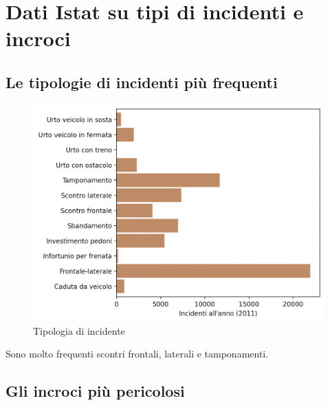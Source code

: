\documentclass[a4paper]{report}
\begin{document}

\section{Dati Istat su tipi di incidenti e incroci}

\subsection{Le tipologie di incidenti più frequenti}

\begin{figure}
    \includegraphics[width=\linewidth]{../src/incidenti/incidenti_senza_coords/localizzazione_incidente/tipo_incidente.png}
    \caption{Tipologia di incidente}
    \label{fig:tipo_incidente}
\end{figure}

Sono molto frequenti scontri frontali, laterali e tamponamenti.

\subsection{Gli incroci più pericolosi}
\end{document}

